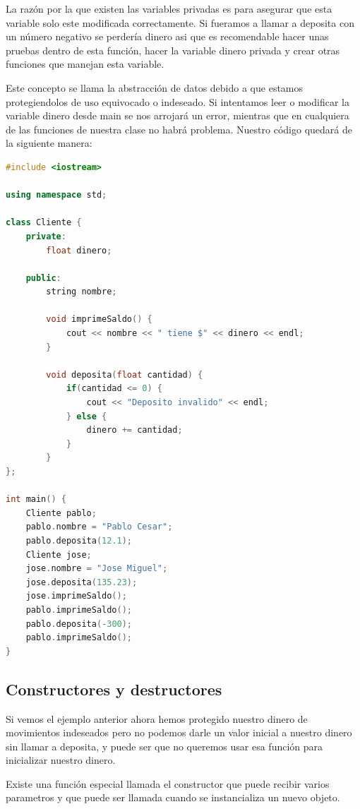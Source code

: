 \documentclass{article}
\begin{document}
La razón por la que existen las variables privadas es para asegurar que esta variable solo este modificada correctamente. Si fueramos a llamar a deposita con un número negativo se perdería dinero asi que es recomendable hacer unas pruebas dentro de esta función, hacer la variable dinero privada y crear otras funciones que manejan esta variable.

Este concepto se llama la abstracción de datos debido a que estamos protegiendolos de uso equivocado o indeseado. Si intentamos leer o modificar la variable dinero desde main se nos arrojará un error, mientras que en cualquiera de las funciones de nuestra clase no habrá problema. Nuestro código quedará de la siguiente manera:

\begin{lstlisting}[language=C++, caption=Abstracción de datos]
#include <iostream>

using namespace std;

class Cliente {
    private:
        float dinero;

    public:
        string nombre;

        void imprimeSaldo() {
            cout << nombre << " tiene $" << dinero << endl;
        }

        void deposita(float cantidad) {
            if(cantidad <= 0) {
                cout << "Deposito invalido" << endl;
            } else {
                dinero += cantidad;
            }
        }
};

int main() {
    Cliente pablo;
    pablo.nombre = "Pablo Cesar";
    pablo.deposita(12.1);
    Cliente jose;
    jose.nombre = "Jose Miguel";
    jose.deposita(135.23);
    jose.imprimeSaldo();
    pablo.imprimeSaldo();
    pablo.deposita(-300);
    pablo.imprimeSaldo();
}
\end{lstlisting}

\subsection{Constructores y destructores}

Si vemos el ejemplo anterior ahora hemos protegido nuestro dinero de movimientos indeseados pero no podemos darle un valor inicial a nuestro dinero sin llamar a deposita, y puede ser que no queremos usar esa función para inicializar nuestro dinero.

Existe una función especial llamada el constructor que puede recibir varios parametros y que puede ser llamada cuando se instancializa un nuevo objeto.
\end{document}
